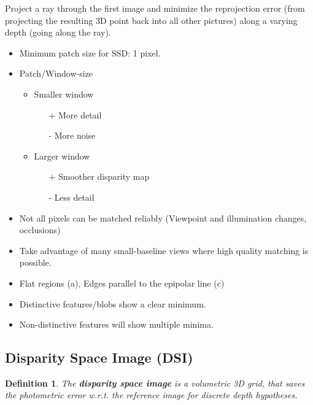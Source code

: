 \documentclass[10pt,a4paper]{scrartcl}
\newtheorem{define}{Definition}
\begin{document}
\begin{multicols*}{2}
Project a ray through the first image and minimize the reprojection error (from projecting the resulting 3D point back into all other pictures) along a varying depth (\glqq going along the ray\grqq).

\begin{itemize}
\item Minimum patch size for SSD: 1 pixel.
\item Patch/Window-size
\begin{itemize}
\item Smaller window
\begin{itemize}
\item[+] More detail
\item[-] More noise
\end{itemize}
\item Larger window
\begin{itemize}
\item[+] Smoother disparity map
\item[-] Less detail
\end{itemize}
\end{itemize}
\item Not all pixels can be matched reliably (Viewpoint and illumination changes, occlusions)
\item Take advantage of many small-baseline views where high quality matching is possible.
\end{itemize}


\begin{itemize}
\item Flat regions (a), Edges parallel to the epipolar line (c)
\item Distinctive features/blobs show a clear minimum.
\item Non-distinctive features will show multiple minima.
\end{itemize}

\subsection{Disparity Space Image (DSI)}

\begin{define}
The \textbf{disparity space image} is a volumetric 3D grid, that saves the photometric error w.r.t. the reference image for discrete depth hypotheses.
\end{define}



\end{multicols*}
\end{document}
